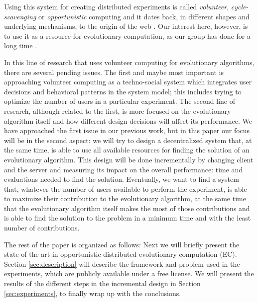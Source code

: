 \documentclass[runningheads,a4paper]{llncs}\usepackage[]{graphicx}\usepackage[]{color}
\begin{document}
Using this system for creating distributed experiments is called {\em
  volunteer}, {\em cycle-scavenging} or {\em opportunistic} computing
\cite{sarmenta2001volunteer} and it dates back, in different shapes
and underlying mechanisms, to the origin of the web \cite{david-seti:home}. Our interest
here, however, is to use it as a resource for evolutionary
computation, as our group has done for a long time \cite{jj-ppsn98}.

In this line of research that uses volunteer computing for
evolutionary algorithms, there are several pending issues. The first
and maybe most important is approaching volunteer computing as a
techno-social system \cite{vespignani2009predicting} which integrates
user decisions and behavioral patterns in the system model; this
includes trying to optimize the number of users in a particular
experiment. The second line of research, although related to the
first, is more focused on the evolutionary algorithm itself and how
different design decisions will affect its performance.
We have approached the first issue in our previous work,
but in this paper our focus will be in the second aspect: we will try to
design a decentralized system that, at the same time, is able to use
all available resources for finding the solution of an evolutionary algorithm. This design will be done incrementally by
changing client and the server and measuring its
impact on the overall performance: time and evaluations needed to find
the solution. Eventually, we want to find a system that, whatever the
number of users available to perform the experiment, is able to
maximize their contribution to the evolutionary algorithm, at the same
time that the evolutionary algorithm itself makes the most of those
contributions and is able to find
the solution to the problem in a minimum time and with the least
number of contributions.

The rest of the paper is organized as follows: Next we will briefly
present the state of the art in opportunistic distributed evolutionary
computation (EC). Section \ref{sec:description} will describe the
framework and problem used in the experiments, which are publicly
available under a free license. We will present the results of the
different steps in the incremental design in Section
\ref{sec:experiments}, to finally wrap up with the conclusions. 

\end{document}
